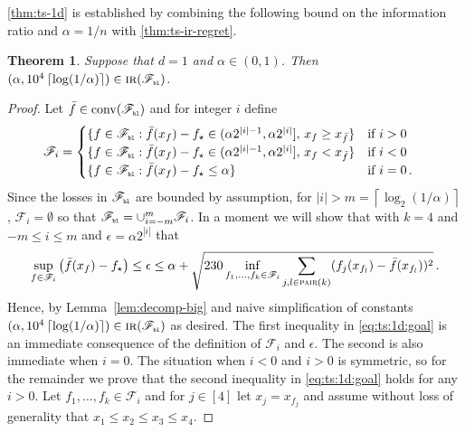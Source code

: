 \documentclass[letter, 12pt]{report}
\newcommand{\pb}{\text{\tiny\texttt{b}}}
\newcommand{\pl}{\text{\tiny\texttt{l}}}
\newcommand{\ceil}[1]{\left\lceil #1 \right\rceil}
\newcommand{\pair}{\operatorname{\textsc{pair}}}
\newcommand{\sF}{\mathscr F}
\newcommand{\conv}{\operatorname{conv}}
\newcommand{\1}{\mathbf{1}}
\newcommand{\IR}{\operatorname{\textsc{ir}}}
\theoremstyle{plain}
\newtheorem{theorem}{Theorem}
\theoremstyle{definition}
\theoremstyle{remark}
\begin{document}
\cref{thm:ts-1d} is established by combining the following bound on the information ratio and $\alpha = 1/n$ with \cref{thm:ts-ir-regret}.

\begin{theorem}\label{thm:ts}
    Suppose that $d = 1$ and $\alpha \in (0,1)$. Then $(\alpha, 10^4 \ceil{\log(1/\alpha)}) \in \IR(\sF_{\pb\pl})$.
\end{theorem}

\begin{proof}
    Let $\bar f \in \conv(\sF_{\pb\pl})$ and for integer $i$ define
    \begin{align}
        \sF_i & = \begin{cases}
                      \{f \in \sF_{\pb\pl} : \bar f(x_f) - f_\star \in (\alpha 2^{|i|-1}, \alpha 2^{|i|}],\, x_f \geq x_{\bar f}\} & \text{if } i > 0     \\
                      \{f \in \sF_{\pb\pl} : \bar f(x_f) - f_\star \in (\alpha 2^{|i|-1}, \alpha 2^{|i|}],\, x_f < x_{\bar f}\}    & \text{if } i < 0     \\
                      \{f \in \sF_{\pb\pl} : \bar f(x_f) - f_\star \leq \alpha \}                                                  & \text{if } i = 0 \,.
                  \end{cases}
    \end{align}
    Since the losses in $\sF_{\pb\pl}$ are bounded by assumption, for $|i| > m = \ceil{\log_2(1/\alpha)}$, $\sF_i = \emptyset$
    so that $\sF_{\pb\pl} = \cup_{i=-m}^m \sF_i$.
    In a moment we will show that with $k = 4$ and $-m \leq i \leq m$ and $\epsilon = \alpha 2^{|i|}$ that
    \begin{align}
        \sup_{f \in \sF_i} \left(\bar f(x_f) - f_\star\right)
        \leq \epsilon \leq \alpha + \sqrt{230\inf_{f_1,\ldots,f_k \in \sF_i} \sum_{j,l \in \pair(k)} (f_j(x_{f_l}) - \bar f(x_{f_l}))^2} \,.
        \label{eq:ts:1d:goal}
    \end{align}
    Hence, by Lemma~\ref{lem:decomp-big} and naive simplification of constants $(\alpha, 10^4 \ceil{\log(1/\alpha)}) \in \IR(\sF_{\pb\pl})$ as desired.
    The first inequality in \cref{eq:ts:1d:goal} is an immediate consequence of the definition of $\sF_i$ and $\epsilon$.
    The second is also immediate when $i = 0$.
    The situation when $i < 0$ and $i > 0$ is symmetric, so for the remainder we prove that the second inequality in \cref{eq:ts:1d:goal} holds for any $i > 0$.
    Let $f_1,\ldots,f_k \in \sF_i$ and
    for $j \in [4]$ let $x_j = x_{f_j}$ and assume without loss of generality that $x_1 \leq x_2 \leq x_3 \leq x_4$.

\end{proof}
\end{document}
